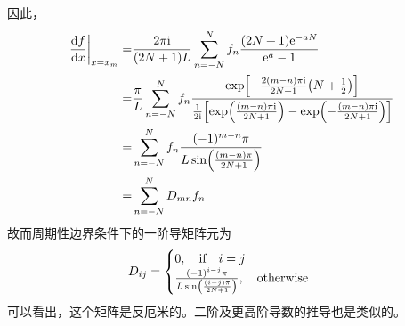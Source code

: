 \documentclass[UTF8,12pt]{article}
\begin{document}
        因此，
        \begin{align}
            \eval{\dv{f}{x}}_{x=x_m}=&\frac{2\pi\mathrm{i}}{(2N+1)L}\sum_{n=-N}^N{f_n\frac{(2N+1)\mathrm{e}^{-aN}}{\mathrm{e}^{a}-1}} \\
            =&\frac{\pi}{L}\sum_{n=-N}^N{f_n\frac{\exp[-\frac{2(m-n)\pi\mathrm{i}}{2N+1}\qty(N+\frac{1}{2})]}{\frac{1}{2\mathrm{i}}\qty[\exp(\frac{(m-n)\pi\mathrm{i}}{2N+1})-\exp(-\frac{(m-n)\pi\mathrm{i}}{2N+1})]}} \\
            =&\sum_{n=-N}^N{f_n\frac{(-1)^{m-n}\pi}{L\sin(\frac{(m-n)\pi}{2N+1})}} \\
            =&\sum_{n=-N}^N{D_{mn}f_n}
        \end{align}
        故而周期性边界条件下的一阶导矩阵元为
        \begin{equation}
            D_{ij}=\begin{cases}
                0,\qif i=j \\
                \frac{(-1)^{i-j}\pi}{L\sin(\frac{(i-j)\pi}{2N+1})},\qotherwise
            \end{cases}
        \end{equation}
        可以看出，这个矩阵是反厄米的。二阶及更高阶导数的推导也是类似的。
\end{document}

